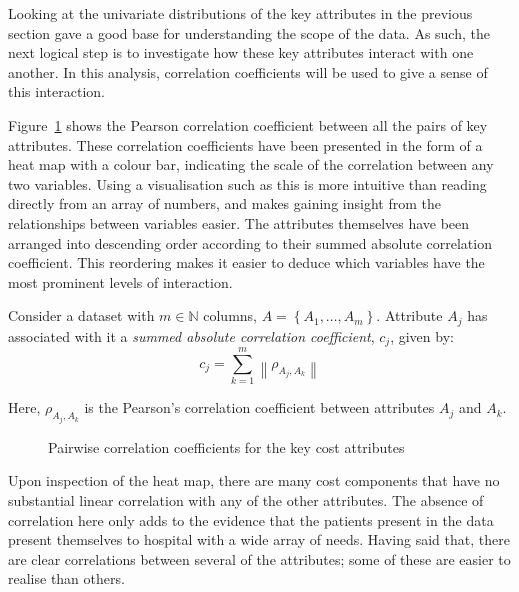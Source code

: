 Looking at the univariate distributions of the key attributes in the previous
section gave a good base for understanding the scope of the data. As such, the
next logical step is to investigate how these key attributes interact with one
another. In this analysis, correlation coefficients will be used to give a sense
of this interaction.

Figure~\ref{fig:corr_heatmap} shows the Pearson correlation coefficient between
all the pairs of key attributes. These correlation coefficients have been
presented in the form of a heat map with a colour bar, indicating the scale of
the correlation between any two variables. Using a visualisation such as this is
more intuitive than reading directly from an array of numbers, and makes gaining
insight from the relationships between variables easier. The attributes
themselves have been arranged into descending order according to their summed
absolute correlation coefficient. This reordering makes it easier to deduce
which variables have the most prominent levels of interaction.

\begin{definition}
    Consider a dataset with \(m \in \mathbb{N}\) columns,
    \(A = \left\{A_1, \ldots, A_m\right\}\). Attribute \(A_j\) has
    associated with it a \emph{summed absolute correlation coefficient},
    \(c_j\), given by:
    \begin{equation}\label{eq:abs_corr}
        c_j = \sum_{k=1}^{m} \left\| \rho_{A_j, A_k} \right\|
    \end{equation}

    Here, \(\rho_{A_j, A_k}\) is the Pearson's correlation coefficient
    between attributes \(A_j\) and \(A_k\).
\end{definition}

\begin{figure}
    \caption{%
        Pairwise correlation coefficients for the key cost attributes
    }\label{fig:corr_heatmap}
\end{figure}

Upon inspection of the heat map, there are many cost components that have no
substantial linear correlation with any of the other attributes. The absence of
correlation here only adds to the evidence that the patients present in the data
present themselves to hospital with a wide array of needs. Having said that,
there are clear correlations between several of the attributes; some of these
are easier to realise than others.

